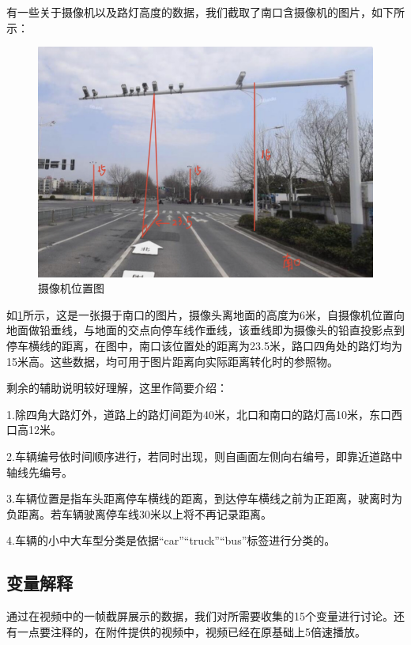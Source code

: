有一些关于摄像机以及路灯高度的数据，我们截取了南口含摄像机的图片，如下所示：
\begin{figure}[h]
    \centering
    \includegraphics[scale=0.13]{figures/摄像机位置图.jpg}
    \caption{摄像机位置图}
    \label{fig:p3}
\end{figure}

如\ref{fig:p3}所示，这是一张摄于南口的图片，摄像头离地面的高度为6米，自摄像机位置向地面做铅垂线，与地面的交点向停车线作垂线，该垂线即为摄像头的铅直投影点到停车横线的距离，在图中，南口该位置处的距离为23.5米，路口四角处的路灯均为15米高。这些数据，均可用于图片距离向实际距离转化时的参照物。

剩余的辅助说明较好理解，这里作简要介绍：

1.除四角大路灯外，道路上的路灯间距为40米，北口和南口的路灯高10米，东口西口高12米。

2.车辆编号依时间顺序进行，若同时出现，则自画面左侧向右编号，即靠近道路中轴线先编号。

3.车辆位置是指车头距离停车横线的距离，到达停车横线之前为正距离，驶离时为负距离。若车辆驶离停车线30米以上将不再记录距离。

4.车辆的小中大车型分类是依据“car”“truck”“bus”标签进行分类的。

\subsection{变量解释}\label{subsec:hypothesis-variables}

通过在视频中的一帧截屏展示的数据，我们对所需要收集的15个变量进行讨论。还有一点要注释的，在附件提供的视频中，视频已经在原基础上5倍速播放。

